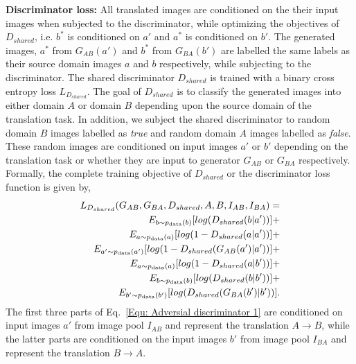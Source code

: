\documentclass[a4paper,twoside]{article}
\begin{document}
\noindent\textbf{Discriminator loss:} 
All translated images are conditioned on the their input images when subjected to the discriminator, while optimizing the objectives of $D_{shared}$, i.e. $b^*$ is conditioned on $a'$ and $a^*$ is conditioned on $b'$.
The generated images, $a^*$ from $G_{AB}(a')$ and $b^*$ from $G_{BA}(b')$ are labelled the same labels as their source domain images $a$ and $b$ respectively, while subjecting to the discriminator.
The shared discriminator $D_{shared}$ is trained with a binary cross entropy loss $L_{D_{shared}}$.
The goal of $D_{shared}$ is to classify the generated images into either domain $A$ or domain $B$ depending upon the source domain of the translation task. In addition, we subject the shared discriminator to random domain $B$ images labelled as \textit{true} and random domain $A$ images labelled as \textit{false}. These random images are conditioned on input images $a'$ or $b'$ depending on the translation task or whether they are input to generator $G_{AB}$ or $G_{BA}$ respectively. Formally, the complete training objective of $D_{shared}$ or the discriminator loss function is given by,
\begin{align}
{L}_{D_{shared}}(G_{AB}, G_{BA}, D_{shared}, A, B, I_{AB}, I_{BA}) = \nonumber\\ {E}_{b\sim{p_{\rm data}}(b)}[log(D_{shared}(b|a'))] + \nonumber\\ 
{E}_{a\sim{p_{\rm data}}(a)}[log(1 - D_{shared}(a|a'))] + \nonumber\\
{E}_{a'\sim{p_{\rm data}}(a')}[log(1 - D_{shared}(G_{AB}(a')|a'))] + \nonumber\\ 
{E}_{a\sim{p_{\rm data}}(a)}[log(1 - D_{shared}(a|b'))] + \nonumber\\
{E}_{b\sim{p_{\rm data}}(b)}[log(D_{shared}(b|b'))] + \nonumber\\ 
{E}_{b'\sim{p_{\rm data}}(b')}[log(D_{shared}(G_{BA}(b')|b'))].
\label{Equ: Adversial discriminator 1}
\end{align}
The first three parts of Eq.~\ref{Equ: Adversial discriminator 1} are conditioned on input images $a'$ from image pool $I_{AB}$ and represent the translation $A\rightarrow B$, while the latter parts are conditioned on the input images $b'$ from image pool $I_{BA}$ and represent the translation $B\rightarrow A$.
\end{document}
